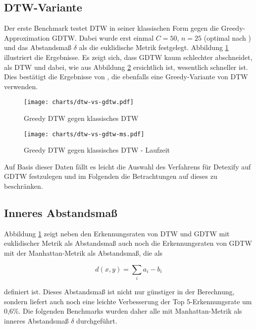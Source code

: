 \subsection{DTW-Variante}
\label{sub:gierig_oder_nicht}

Der erste Benchmark testet DTW in seiner klassischen Form gegen die Greedy-Approximation GDTW. Dabei wurde erst einmal $C=50$, $n=25$ (optimal nach \citet{Golubitsky:2009p1842}) und das Abstandsmaß $\delta$ als die euklidische Metrik festgelegt. Abbildung \ref{chart:dtw-vs-gdtw} illustriert die Ergebnisse. Es zeigt sich, dass GDTW kaum schlechter abschneidet, als DTW und dabei, wie aus Abbildung \ref{chart:dtw-vs-gdtw-ms} ersichtlich ist, wesentlich schneller ist. Dies bestätigt die Ergebnisse von \citet{MacLean:2010p9970}, die ebenfalls eine Greedy-Variante von DTW verwenden.

\begin{figure}[htbp]
  \begin{center}
    \texttt{[image: charts/dtw-vs-gdtw.pdf]}
  \end{center}
  \caption{Greedy DTW gegen klassisches DTW}
  \label{chart:dtw-vs-gdtw}
\end{figure}

\begin{figure}[htbp]
  \begin{center}
    \texttt{[image: charts/dtw-vs-gdtw-ms.pdf]}
  \end{center}
  \caption{Greedy DTW gegen klassisches DTW - Laufzeit}
  \label{chart:dtw-vs-gdtw-ms}
\end{figure}

Auf Basis dieser Daten fällt es leicht die Auswahl des Verfahrens für Detexify auf GDTW festzulegen und im Folgenden die Betrachtungen auf dieses zu beschränken.


\subsection{Inneres Abstandsmaß} %
\label{sub:inneres_abstandsmaß}

Abbildung \ref{chart:dtw-vs-gdtw} zeigt neben den Erkennungsraten von DTW und GDTW mit euklidischer Metrik als Abstandsmaß auch noch die Erkennungsraten von GDTW mit der Manhattan-Metrik als Abstandsmaß, die als

\[ d(x,y) = \sum_i a_i - b_i \]

definiert ist. Dieses Abstandsmaß ist nicht nur günstiger in der Berechnung, sondern liefert auch noch eine leichte Verbesserung der Top 5-Erkennungsrate um 0,6\%. Die folgenden Benchmarks wurden daher alle mit Manhattan-Metrik als inneres Abstandsmaß $\delta$ durchgeführt.

